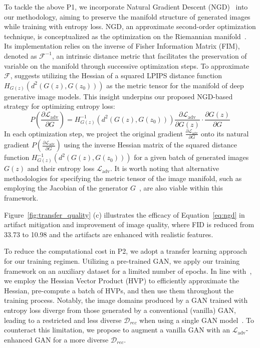 To tackle the above P1, we incorporate Natural Gradient Descent (NGD)~\cite{ngd} into our methodology, aiming to preserve the manifold structure of generated images while training with entropy loss.
NGD, an approximate second-order optimization technique, is conceptualized as the optimization on the Riemannian manifold~\cite{ro}.
Its implementation relies on the inverse of Fisher Information Matrix (FIM), denoted as $\mathcal{F}^{-1}$, an intrinsic distance metric that facilitates the preservation of variable on the manifold through successive optimization steps.
To approximate $\mathcal{F}$, \cite{rogan21iclr} suggests utilizing the Hessian of a squared LPIPS distance function $H_{G(z)}(d^2(G(z),G(z_0)))$ as the metric tensor for the manifold of deep generative image models.
This insight underpins our proposed NGD-based strategy for optimizing entropy loss:
\begin{equation}
	P(\frac{\partial \mathcal{L}_{\text{adv}}}{\partial G}) = H^{-1}_{G(z)}(d^2(G(z),G(z_0))) \frac{\partial \mathcal{L}_{\text{adv}}}{\partial G(z)} \cdot \frac{\partial G(z)}{\partial G}
	\label{eq:ngd}
\end{equation}
In each optimization step, we project the original gradient $\frac{\partial \mathcal{L}_{\text{adv}}}{\partial G}$ onto its natural gradient $P(\frac{\partial \mathcal{L}_{\text{adv}}}{\partial G})$ using the inverse Hessian matrix of the squared distance function $H^{-1}_{G(z)}(d^2(G(z),G(z_0)))$ for a given batch of generated images $G(z)$ and their entropy loss $\mathcal{L}_{\text{adv}}$.
It is worth noting that alternative methodologies for specifying the metric tensor of the image manifold, such as employing the Jacobian of the generator $G$~\cite{rogan18cvpr}, are also viable within this framework.

Figure~\ref{fig:transfer_quality} (c) illustrates the efficacy of Equation~\ref{eq:ngd} in artifact mitigation and improvement of image quality, where FID is reduced from 33.73 to 10.98 and the artifacts are enhanced with realistic features.

To reduce the computational cost in P2, we adopt a transfer learning approach for our training regimen.
Utilizing a pre-trained GAN, we apply our training framework on an auxiliary dataset for a limited number of epochs.
In line with~\cite{rogan21iclr}, we employ the Hessian Vector Product (HVP) to efficiently approximate the Hessian, pre-compute a batch of HVPs, and then use them throughout the training process.
Notably, the image domains produced by a GAN trained with entropy loss diverge from those generated by a conventional (vanilla) GAN, leading to a restricted and less diverse $\mathcal{D}_{rec}$ when using a single GAN model~\cite{ppa22icml,vmi21nips}.
To counteract this limitation, we propose to augment a vanilla GAN with an $\mathcal{L}_{\text{adv}}$-enhanced GAN for a more diverse $\mathcal{D}_{rec}$.

